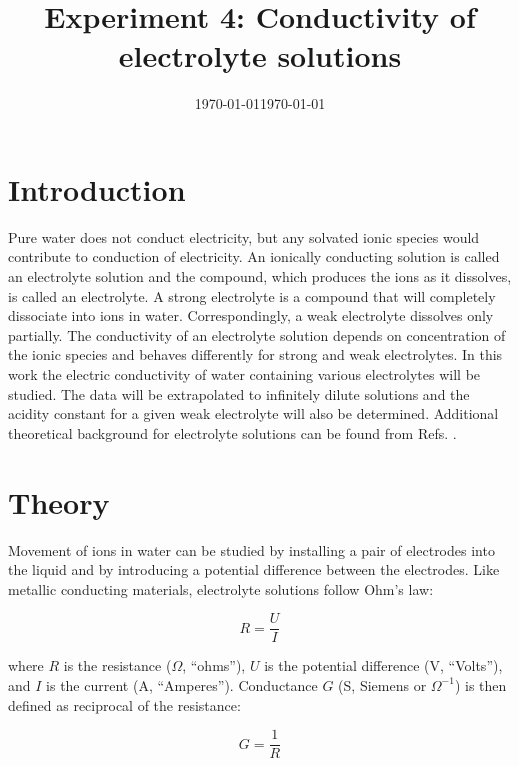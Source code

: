 \documentclass[byrevtex,amssymb,aps,pra,floatfix,letterpaper]{revtex4}
\date{\today}
\begin{document}
\title{Experiment 4: Conductivity of electrolyte solutions}

\date{\today}

\maketitle

\section{Introduction}

Pure water does not conduct electricity, but any solvated ionic species would contribute to conduction of electricity. An ionically conducting solution is called an electrolyte solution and the compound, which produces the ions as it dissolves, is called an electrolyte. A strong electrolyte is a compound that will completely dissociate into ions in water. Correspondingly, a weak electrolyte dissolves only partially. The conductivity of an electrolyte solution depends on concentration of the ionic species and behaves differently for strong and weak electrolytes. In this work the electric conductivity of water containing various electrolytes will be studied. The data will be extrapolated to infinitely dilute solutions and the acidity constant for a given weak electrolyte will also be determined. Additional theoretical background for electrolyte solutions can be found from Refs. \cite{ATKINS1,SILBEY,CHANG}.

\section{Theory}

Movement of ions in water can be studied by installing a pair of electrodes into the liquid and by introducing a potential difference between the electrodes. Like metallic conducting materials, electrolyte solutions follow Ohm's law:

\begin{equation}
R = \frac{U}{I}
\label{eq1}
\end{equation}

\noindent
where $R$ is the resistance ($\Omega$, ``ohms''), $U$ is the potential difference (V, ``Volts''), and $I$ is the current (A, ``Amperes''). Conductance $G$ (S, Siemens or $\Omega^{-1}$) is then defined as reciprocal of the resistance:

\begin{equation}
G = \frac{1}{R}
\label{eq2}
\end{equation}
\end{document}
